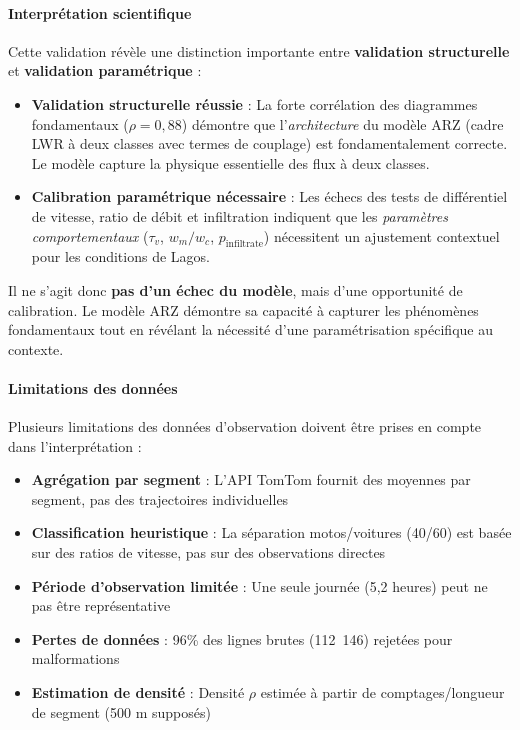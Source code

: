 \paragraph{Interprétation scientifique}

Cette validation révèle une distinction importante entre \textbf{validation structurelle} et \textbf{validation paramétrique} :

\begin{itemize}
    \item \textbf{Validation structurelle réussie} : La forte corrélation des diagrammes fondamentaux ($\rho = 0{,}88$) démontre que l'\textit{architecture} du modèle ARZ (cadre LWR à deux classes avec termes de couplage) est fondamentalement correcte. Le modèle capture la physique essentielle des flux à deux classes.

    \item \textbf{Calibration paramétrique nécessaire} : Les échecs des tests de différentiel de vitesse, ratio de débit et infiltration indiquent que les \textit{paramètres comportementaux} ($\tau_v$, $w_m/w_c$, $p_{\text{infiltrate}}$) nécessitent un ajustement contextuel pour les conditions de Lagos.
\end{itemize}

Il ne s'agit donc \textbf{pas d'un échec du modèle}, mais d'une opportunité de calibration. Le modèle ARZ démontre sa capacité à capturer les phénomènes fondamentaux tout en révélant la nécessité d'une paramétrisation spécifique au contexte.

\paragraph{Limitations des données}

Plusieurs limitations des données d'observation doivent être prises en compte dans l'interprétation :

\begin{itemize}
    \item \textbf{Agrégation par segment} : L'API TomTom fournit des moyennes par segment, pas des trajectoires individuelles
    \item \textbf{Classification heuristique} : La séparation motos/voitures (40/60) est basée sur des ratios de vitesse, pas sur des observations directes
    \item \textbf{Période d'observation limitée} : Une seule journée (5,2 heures) peut ne pas être représentative
    \item \textbf{Pertes de données} : 96\% des lignes brutes (112~146) rejetées pour malformations
    \item \textbf{Estimation de densité} : Densité $\rho$ estimée à partir de comptages/longueur de segment (500 m supposés)
\end{itemize}

